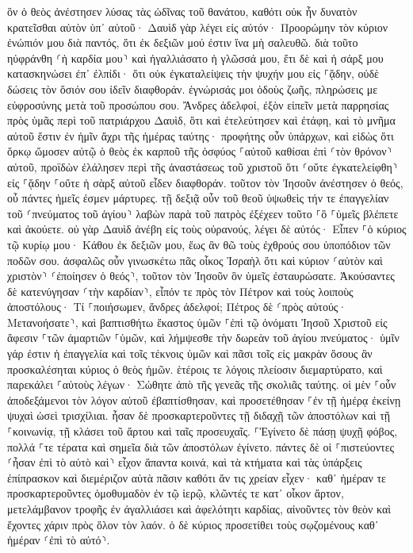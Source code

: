 \documentclass[twoside, 9pt]{extreport}
\begin{document}
ὃν ὁ θεὸς ἀνέστησεν λύσας τὰς ὠδῖνας τοῦ θανάτου, καθότι οὐκ ἦν δυνατὸν κρατεῖσθαι αὐτὸν ὑπ᾽ αὐτοῦ· 
Δαυὶδ γὰρ λέγει εἰς αὐτόν· Προορώμην τὸν κύριον ἐνώπιόν μου διὰ παντός, ὅτι ἐκ δεξιῶν μού ἐστιν ἵνα μὴ σαλευθῶ. 
διὰ τοῦτο ηὐφράνθη ⸂ἡ καρδία μου⸃ καὶ ἠγαλλιάσατο ἡ γλῶσσά μου, ἔτι δὲ καὶ ἡ σάρξ μου κατασκηνώσει ἐπ᾽ ἐλπίδι· 
ὅτι οὐκ ἐγκαταλείψεις τὴν ψυχήν μου εἰς ⸀ᾅδην, οὐδὲ δώσεις τὸν ὅσιόν σου ἰδεῖν διαφθοράν. 
ἐγνώρισάς μοι ὁδοὺς ζωῆς, πληρώσεις με εὐφροσύνης μετὰ τοῦ προσώπου σου. 
Ἄνδρες ἀδελφοί, ἐξὸν εἰπεῖν μετὰ παρρησίας πρὸς ὑμᾶς περὶ τοῦ πατριάρχου Δαυὶδ, ὅτι καὶ ἐτελεύτησεν καὶ ἐτάφη, καὶ τὸ μνῆμα αὐτοῦ ἔστιν ἐν ἡμῖν ἄχρι τῆς ἡμέρας ταύτης· 
προφήτης οὖν ὑπάρχων, καὶ εἰδὼς ὅτι ὅρκῳ ὤμοσεν αὐτῷ ὁ θεὸς ἐκ καρποῦ τῆς ὀσφύος ⸀αὐτοῦ καθίσαι ἐπὶ ⸂τὸν θρόνον⸃ αὐτοῦ, 
προϊδὼν ἐλάλησεν περὶ τῆς ἀναστάσεως τοῦ χριστοῦ ὅτι ⸂οὔτε ἐγκατελείφθη⸃ εἰς ⸀ᾅδην ⸀οὔτε ἡ σὰρξ αὐτοῦ εἶδεν διαφθοράν. 
τοῦτον τὸν Ἰησοῦν ἀνέστησεν ὁ θεός, οὗ πάντες ἡμεῖς ἐσμεν μάρτυρες. 
τῇ δεξιᾷ οὖν τοῦ θεοῦ ὑψωθεὶς τήν τε ἐπαγγελίαν τοῦ ⸂πνεύματος τοῦ ἁγίου⸃ λαβὼν παρὰ τοῦ πατρὸς ἐξέχεεν τοῦτο ⸀ὃ ⸀ὑμεῖς βλέπετε καὶ ἀκούετε. 
οὐ γὰρ Δαυὶδ ἀνέβη εἰς τοὺς οὐρανούς, λέγει δὲ αὐτός· Εἶπεν ⸀ὁ κύριος τῷ κυρίῳ μου· Κάθου ἐκ δεξιῶν μου, 
ἕως ἂν θῶ τοὺς ἐχθρούς σου ὑποπόδιον τῶν ποδῶν σου. 
ἀσφαλῶς οὖν γινωσκέτω πᾶς οἶκος Ἰσραὴλ ὅτι καὶ κύριον ⸂αὐτὸν καὶ χριστὸν⸃ ⸂ἐποίησεν ὁ θεός⸃, τοῦτον τὸν Ἰησοῦν ὃν ὑμεῖς ἐσταυρώσατε. 
Ἀκούσαντες δὲ κατενύγησαν ⸂τὴν καρδίαν⸃, εἶπόν τε πρὸς τὸν Πέτρον καὶ τοὺς λοιποὺς ἀποστόλους· Τί ⸀ποιήσωμεν, ἄνδρες ἀδελφοί; 
Πέτρος δὲ ⸂πρὸς αὐτούς· Μετανοήσατε⸃, καὶ βαπτισθήτω ἕκαστος ὑμῶν ⸀ἐπὶ τῷ ὀνόματι Ἰησοῦ Χριστοῦ εἰς ἄφεσιν ⸀τῶν ἁμαρτιῶν ⸀ὑμῶν, καὶ λήμψεσθε τὴν δωρεὰν τοῦ ἁγίου πνεύματος· 
ὑμῖν γάρ ἐστιν ἡ ἐπαγγελία καὶ τοῖς τέκνοις ὑμῶν καὶ πᾶσι τοῖς εἰς μακρὰν ὅσους ἂν προσκαλέσηται κύριος ὁ θεὸς ἡμῶν. 
ἑτέροις τε λόγοις πλείοσιν διεμαρτύρατο, καὶ παρεκάλει ⸀αὐτοὺς λέγων· Σώθητε ἀπὸ τῆς γενεᾶς τῆς σκολιᾶς ταύτης. 
οἱ μὲν ⸀οὖν ἀποδεξάμενοι τὸν λόγον αὐτοῦ ἐβαπτίσθησαν, καὶ προσετέθησαν ⸀ἐν τῇ ἡμέρᾳ ἐκείνῃ ψυχαὶ ὡσεὶ τρισχίλιαι. 
ἦσαν δὲ προσκαρτεροῦντες τῇ διδαχῇ τῶν ἀποστόλων καὶ τῇ ⸀κοινωνίᾳ, τῇ κλάσει τοῦ ἄρτου καὶ ταῖς προσευχαῖς. 
⸀Ἐγίνετο δὲ πάσῃ ψυχῇ φόβος, πολλά ⸀τε τέρατα καὶ σημεῖα διὰ τῶν ἀποστόλων ἐγίνετο. 
πάντες δὲ οἱ ⸀πιστεύοντες ⸂ἦσαν ἐπὶ τὸ αὐτὸ καὶ⸃ εἶχον ἅπαντα κοινά, 
καὶ τὰ κτήματα καὶ τὰς ὑπάρξεις ἐπίπρασκον καὶ διεμέριζον αὐτὰ πᾶσιν καθότι ἄν τις χρείαν εἶχεν· 
καθ᾽ ἡμέραν τε προσκαρτεροῦντες ὁμοθυμαδὸν ἐν τῷ ἱερῷ, κλῶντές τε κατ᾽ οἶκον ἄρτον, μετελάμβανον τροφῆς ἐν ἀγαλλιάσει καὶ ἀφελότητι καρδίας, 
αἰνοῦντες τὸν θεὸν καὶ ἔχοντες χάριν πρὸς ὅλον τὸν λαόν. ὁ δὲ κύριος προσετίθει τοὺς σῳζομένους καθ᾽ ἡμέραν ⸂ἐπὶ τὸ αὐτό⸃. 
\end{document}
